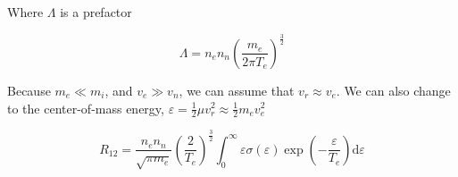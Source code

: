 \documentclass[11pt]{article}
\begin{document}
Where $\Lambda$ is a prefactor

\begin{equation}
	\Lambda = n_e n_n \left( \frac{m_e}{2 \pi T_e} \right)^{\frac{3}{2}} 
\end{equation}

Because $m_e \ll m_i$, and $v_e \gg v_n$, we can assume that $v_r \approx v_e$. We can also change to the center-of-mass energy, $\varepsilon = \frac{1}{2} \mu v_r^2 \approx \frac{1}{2} m_e v_e^2$

\begin{equation}
	R_{12} = \frac{n_e n_n}{\sqrt{\pi m_e}} \left( \frac{2}{T_e} \right)^{\frac{3}{2}}  \int_0^\infty \varepsilon \sigma(\varepsilon) \exp{ \left( -\frac{\varepsilon}{T_e} \right) } \mathrm{d} \varepsilon
\end{equation}
\end{document}
